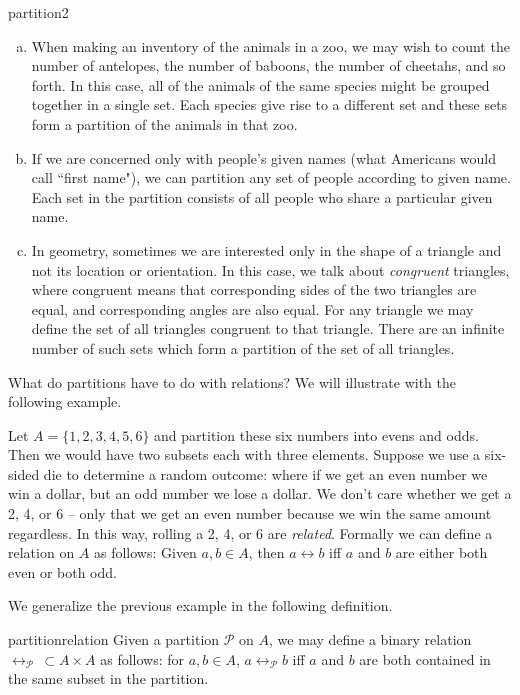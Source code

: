 \begin{example}{partition2}
\begin{enumerate}[(a)]
\item When making an inventory of the animals in a zoo, we may wish to count the number of antelopes, the number of baboons, the number of cheetahs, and so forth. In this case, all of the animals of the same species might be grouped together in a single set. Each species give rise to a different set and these sets form a partition of the animals in that zoo.
\item If we are concerned only with people's given names (what Americans would call ``first name"), we can partition any set of people according to given name. Each set in the partition consists of all people who share a particular given name.
\item In geometry, sometimes we are interested only in the shape of a triangle and not its location or orientation. In this case, we talk about \emph{congruent} triangles, where congruent means that corresponding sides of the two triangles are equal, and corresponding angles are also equal. For any triangle we may define the set of all triangles congruent to that triangle. There are an infinite number of such sets which form a partition of the set of all triangles.
\end{enumerate}
\end{example}


What do partitions have to do with relations? We will illustrate with the following example.

Let $A=\{1,2,3,4,5,6\}$ and partition these six numbers into evens and odds. Then we would have two subsets each with three elements. Suppose we use a six-sided die to determine a random outcome: where if we get an even number we win a dollar, but an odd number we lose a dollar. We don't care whether we get a 2, 4, or 6 -- only that we get an even number because we win the same amount regardless. In this way, rolling a 2, 4, or 6 are \emph{related}. Formally we can define a relation on $A$ as follows: Given $a,b \in A$, then $a \rel b$ iff $a$ and $b$ are either both even or both odd.

We generalize the previous example in the following definition. 

\begin{defn}{partitionrelation}
Given a partition $\mathcal{P}$ on $A$, we may define a binary relation $\rel_\mathcal{P}\,\subset A \times A$ as follows: for $a,b \in A$, $a \rel_\mathcal{P} b$ iff $a$ and $b$ are both contained in the same subset in the partition.
\end{defn}

